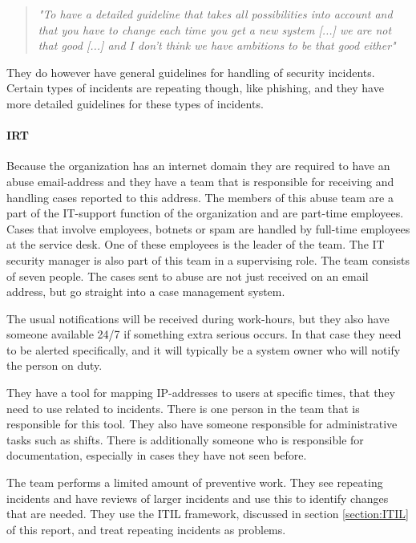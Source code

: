 \begin{quote}
\textit{"To have a detailed guideline that takes all possibilities into account and that you have to change each time you get a new system %
[...] we are not that good [...] and I don't think we have ambitions to be that good either"}
\end{quote}

They do however have general guidelines for handling of security incidents. Certain types of incidents are repeating though, like phishing, and they have more detailed guidelines for these types of incidents.

\paragraph{\acl{IRT}}
Because the organization has an internet domain they are required to have an abuse email-address and they have a team that is responsible for receiving and handling cases reported to this address. The members of this abuse team are a part of the IT-support function of the organization and are part-time employees. Cases that involve employees, botnets or spam are handled by full-time employees at the service desk. One of these employees is the leader of the team. The IT security manager is also part of this team in a supervising role. The team consists of seven people. The cases sent to abuse are not just received on an email address, but go straight into a case management system. 

The usual notifications will be received during work-hours, but they also have someone available 24/7 if something extra serious occurs. In that case they need to be alerted specifically, and it will typically be a system owner who will notify the person on duty.

They have a tool for mapping IP-addresses to users at specific times, that they need to use related to incidents. There is one person in the team that is responsible for this tool. They also have someone responsible for administrative tasks such as shifts. There is additionally someone who is responsible for documentation, especially in cases they have not seen before.

The team performs a limited amount of preventive work. They see repeating incidents and have reviews of larger incidents and use this to identify changes that are needed. They use the \ac{ITIL} framework, discussed in section \ref{section:ITIL} of this report, and treat repeating incidents as problems.

